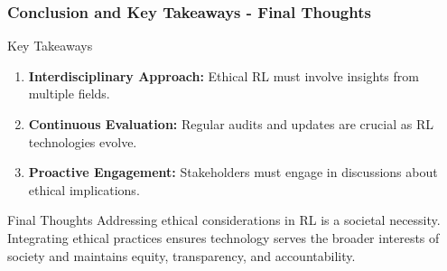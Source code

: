 \documentclass{beamer}
\begin{document}
\begin{frame}[fragile]
    \frametitle{Conclusion and Key Takeaways - Final Thoughts}
    \begin{block}{Key Takeaways}
        \begin{enumerate}
            \item \textbf{Interdisciplinary Approach:} Ethical RL must involve insights from multiple fields.
            \item \textbf{Continuous Evaluation:} Regular audits and updates are crucial as RL technologies evolve.
            \item \textbf{Proactive Engagement:} Stakeholders must engage in discussions about ethical implications.
        \end{enumerate}
    \end{block}
    
    \begin{block}{Final Thoughts}
        Addressing ethical considerations in RL is a societal necessity. Integrating ethical practices ensures technology serves the broader interests of society and maintains equity, transparency, and accountability.
    \end{block}
\end{frame}
\end{document}
